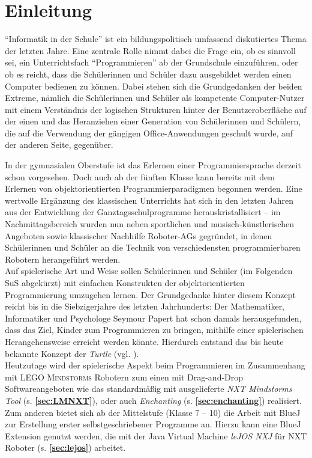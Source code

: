 \documentclass[paper=a4, DIV=calc, BCOR=12mm, twoside=on, onecolumn=on, open = right, titlepage =on, parskip =half-, headsepline = on, footsepline = off, chapterprefix = off, appendixprefix = on, fontsize = 12pt, numbers = noenddot, abstract = on]{scrbook}
\begin{document}
\chapter{Einleitung}
\label{sec:einleitung}
\onehalfspacing
"`Informatik in der Schule"' ist ein bildungspolitisch umfassend diskutiertes Thema der letzten Jahre. Eine zentrale Rolle nimmt dabei die Frage ein, ob es sinnvoll sei, ein Unterrichtsfach "`Programmieren"' ab der Grundschule einzuführen, oder ob es reicht, dass die Schülerinnen und Schüler dazu ausgebildet werden einen Computer bedienen zu können. Dabei stehen sich die Grundgedanken der beiden Extreme, nämlich die Schülerinnen und Schüler als kompetente Computer-Nutzer mit einem Verständnis der logischen Strukturen hinter der Benutzeroberfläche auf der einen und das Heranziehen einer Generation von Schülerinnen und Schülern, die auf die Verwendung der gängigen Office-Anwendungen geschult wurde, auf der anderen Seite, gegenüber.

In der gymnasialen Oberstufe ist das Erlernen einer Programmiersprache derzeit schon vorgesehen. Doch auch ab der fünften Klasse kann bereits mit dem Erlernen von objektorientierten Programmierparadigmen begonnen werden. Eine wertvolle Ergänzung des klassischen Unterrichts hat sich in den letzten Jahren aus der Entwicklung der Ganztagsschulprogramme herauskristallisiert -- im Nachmittagsbereich wurden nun neben sportlichen und musisch-künstlerischen Angeboten sowie klassischer Nachhilfe Roboter-AGs gegründet, in denen Schülerinnen und Schüler an die Technik von verschiedensten programmierbaren Robotern herangeführt werden.\\
Auf spielerische Art und Weise sollen Schülerinnen und Schüler (im Folgenden SuS abgekürzt) mit einfachen Konstrukten der objektorientierten Programmierung umzugehen lernen. Der Grundgedanke hinter diesem Konzept reicht bis in die Siebzigerjahre des letzten Jahrhunderts: Der Mathematiker, Informatiker und Psychologe Seymour Papert hat schon damals herausgefunden, dass das Ziel, Kinder zum Programmieren zu bringen, mithilfe einer spielerischen Herangehensweise erreicht werden könnte. Hierdurch entstand das bis heute bekannte Konzept der \emph{Turtle} (vgl. \cite[S.365]{nievergelt:99}).\\
Heutzutage wird der spielerische Aspekt beim Programmieren im Zusammenhang mit \textsc{LEGO Mindstorms} Robotern zum einen mit Drag-and-Drop Softwareangeboten wie das standardmäßig mit ausgelieferte \emph{NXT Mindstorms Tool} (s.  \textbf{\ref{sec:LMNXT}}), oder auch \emph{Enchanting} (s. \textbf{\ref{sec:enchanting}}) realisiert. Zum anderen bietet sich ab der Mittelstufe (Klasse 7 -- 10) die Arbeit mit BlueJ zur Erstellung erster selbstgeschriebener Programme an. Hierzu kann eine BlueJ Extension genutzt werden, die mit der Java Virtual Machine \emph{leJOS NXJ} für NXT Roboter (s. \textbf{\ref{sec:lejos}}) arbeitet.
\end{document}
